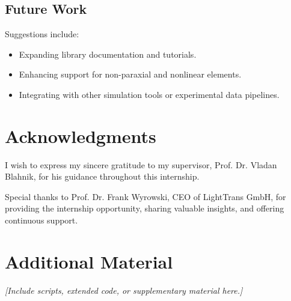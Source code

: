 \documentclass[a4paper,12pt]{report}
\begin{document}
\section{Future Work}
Suggestions include:
\begin{itemize}
    \item Expanding library documentation and tutorials.
    \item Enhancing support for non-paraxial and nonlinear elements.
    \item Integrating with other simulation tools or experimental data pipelines.
\end{itemize}

\chapter{Acknowledgments}
I wish to express my sincere gratitude to my supervisor, Prof. Dr. Vladan Blahnik, for his guidance throughout this internship.

Special thanks to Prof. Dr. Frank Wyrowski, CEO of LightTrans GmbH, for providing the internship opportunity, sharing valuable insights, and offering continuous support.




\appendix
\chapter{Additional Material}
\textit{[Include scripts, extended code, or supplementary material here.]}
\end{document}
